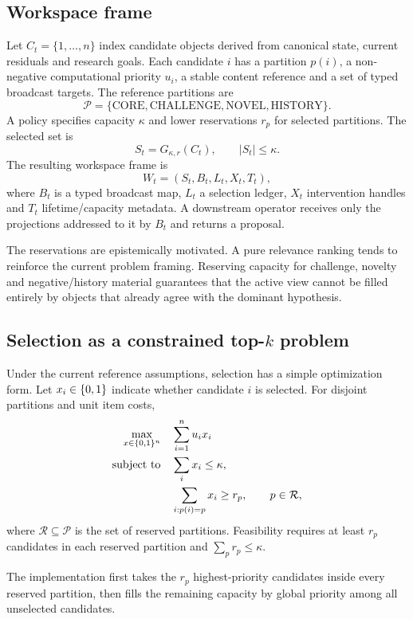 \subsection{Workspace frame}

Let \(C_t=\{1,\ldots,n\}\) index candidate objects derived from canonical state, current residuals and research goals. Each candidate \(i\) has a partition \(p(i)\), a non-negative computational priority \(u_i\), a stable content reference and a set of typed broadcast targets. The reference partitions are
\[
\mathcal P=\{\mathrm{CORE},\mathrm{CHALLENGE},\mathrm{NOVEL},\mathrm{HISTORY}\}.
\]
A policy specifies capacity \(\kappa\) and lower reservations \(r_p\) for selected partitions. The selected set is
\[
S_t=G_{\kappa,r}(C_t),\qquad |S_t|\le \kappa.
\]
The resulting workspace frame is
\[
W_t=(S_t,B_t,L_t,X_t,T_t),
\]
where \(B_t\) is a typed broadcast map, \(L_t\) a selection ledger, \(X_t\) intervention handles and \(T_t\) lifetime/capacity metadata. A downstream operator receives only the projections addressed to it by \(B_t\) and returns a proposal.

The reservations are epistemically motivated. A pure relevance ranking tends to reinforce the current problem framing. Reserving capacity for challenge, novelty and negative/history material guarantees that the active view cannot be filled entirely by objects that already agree with the dominant hypothesis.

\subsection{Selection as a constrained \texorpdfstring{top-$k$}{top-k} problem}

Under the current reference assumptions, selection has a simple optimization form. Let \(x_i\in\{0,1\}\) indicate whether candidate \(i\) is selected. For disjoint partitions and unit item costs,
\[
\begin{aligned}
\max_{x\in\{0,1\}^n}\quad &\sum_{i=1}^n u_i x_i\\
\text{subject to}\quad
&\sum_i x_i\le\kappa,\\
&\sum_{i:p(i)=p}x_i\ge r_p,\qquad p\in\mathcal R,
\end{aligned}
\]
where \(\mathcal R\subseteq\mathcal P\) is the set of reserved partitions. Feasibility requires at least \(r_p\) candidates in each reserved partition and \(\sum_p r_p\le\kappa\).

The implementation first takes the \(r_p\) highest-priority candidates inside every reserved partition, then fills the remaining capacity by global priority among all unselected candidates.

